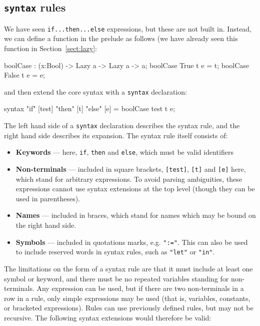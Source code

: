 \subsection{\texttt{syntax} rules}

We have seen \texttt{if...then...else} expressions, but these are not built in.
Instead, we can define a function in the prelude as follows (we have already
seen this function in Section~\ref{sect:lazy}:

\begin{code}
boolCase : (x:Bool) -> Lazy a -> Lazy a -> a; 
boolCase True  t e = t;
boolCase False t e = e;
\end{code}

\noindent
and then extend the core syntax with a \texttt{syntax} declaration:

\begin{code}
syntax "if" [test] "then" [t] "else" [e] = boolCase test t e;
\end{code}

\noindent
The left hand side of a \texttt{syntax} declaration describes the syntax rule, and the right hand side describes its expansion.
The syntax rule itself consists of:

\begin{itemize}
\item \textbf{Keywords} --- here, \texttt{if}, \texttt{then} and \texttt{else}, which must be valid identifiers
\item \textbf{Non-terminals} --- included in square brackets, \texttt{[test]}, \texttt{[t]} and \texttt{[e]} here, which stand for arbitrary expressions.
To avoid parsing ambiguities, these expressions cannot use syntax extensions at the top level (though they can be used in parentheses).
\item \textbf{Names} --- included in braces, which stand for names which may be bound on the right hand side.
\item \textbf{Symbols} --- included in quotations marks, e.g. \texttt{":="}.
This can also be used to include reserved words in syntax rules, such as \texttt{"let"} or \texttt{"in"}.
\end{itemize}

\noindent
The limitations on the form of a syntax rule are that it must include at least one symbol or keyword, and there must be no repeated variables standing for non-terminals.
Any expression can be used, but if there are two non-terminals in a row in a rule, only simple expressions may be used (that is, variables, constants, or bracketed expressions).
Rules can use previously defined rules, but may not be recursive.
The following syntax extensions would therefore be valid:

